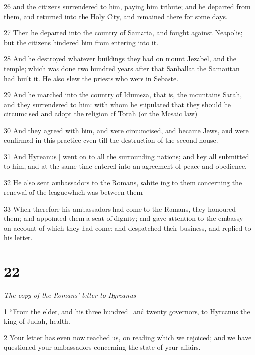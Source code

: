\par 26 and the citizens surrendered to him, paying him tribute; and he departed from them, and returned into the Holy City, and remained there for some days.

\par 27 Then he departed into the country of Samaria, and fought against Neapolis; but the citizens hindered him from entering into it. 

\par 28 And he destroyed whatever buildings they had on mount Jezabel, and the temple; which was done two hundred years after that Sanballat the Samaritan had built it. He also slew the priests who were in Sebaste. 

\par 29 And he marched into the country of Idumeza, that is, the mountains Sarah, and they surrendered to him: with whom he stipulated that they should be circumcised and adopt the religion of Torah (or the Mosaic law). 

\par 30 And they agreed with him, and were circumcised, and became Jews, and were confirmed in this practice even till the destruction of the second house.

\par 31 And Hyreanus | went on to all the surrounding nations; and hey all submitted to him, and at the same time entered into an agreement of peace and obedience. 

\par 32 He also sent ambassadors to the Romans, sahite ing to them concerning the renewal of the leaguewhich was between them. 

\par 33 When therefore his ambassadors had come to the Romans, they honoured them; and appointed them a seat of dignity; and gave attention to the embassy on account of which they had come; and despatched their business, and replied to his letter. 

\chapter{22}

\textit{The copy of the Romans’ letter to Hyrcanus}

\par 1 “From the elder, and his three hundred_and twenty governors, to Hyrcanus the king of Judah, health. 

\par 2 Your letter has even now reached us, on reading which we rejoiced; and we have questioned your ambassadors concerning the state of your affairs. 

